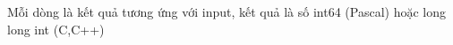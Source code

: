 Mỗi dòng là kết quả tương ứng với input, kết quả là số int64 (Pascal) hoặc long long int (C,C++)